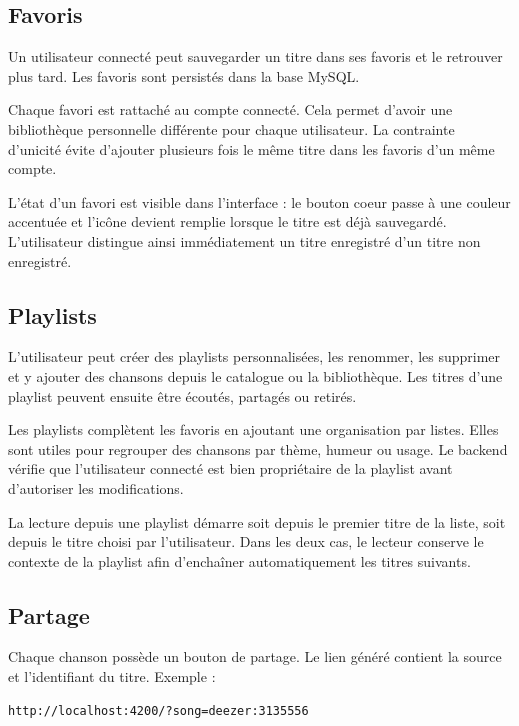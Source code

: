 \documentclass[12pt,a4paper]{report}
\begin{document}
\subsection{Favoris}

Un utilisateur connecté peut sauvegarder un titre dans ses favoris et le
retrouver plus tard. Les favoris sont persistés dans la base MySQL.

Chaque favori est rattaché au compte connecté. Cela permet d'avoir une
bibliothèque personnelle différente pour chaque utilisateur. La contrainte
d'unicité évite d'ajouter plusieurs fois le même titre dans les favoris d'un
même compte.

L'état d'un favori est visible dans l'interface : le bouton coeur passe à une
couleur accentuée et l'icône devient remplie lorsque le titre est déjà
sauvegardé. L'utilisateur distingue ainsi immédiatement un titre enregistré
d'un titre non enregistré.

\subsection{Playlists}

L'utilisateur peut créer des playlists personnalisées, les renommer, les
supprimer et y ajouter des chansons depuis le catalogue ou la bibliothèque. Les
titres d'une playlist peuvent ensuite être écoutés, partagés ou retirés.

Les playlists complètent les favoris en ajoutant une organisation par listes.
Elles sont utiles pour regrouper des chansons par thème, humeur ou usage. Le
backend vérifie que l'utilisateur connecté est bien propriétaire de la playlist
avant d'autoriser les modifications.

La lecture depuis une playlist démarre soit depuis le premier titre de la liste,
soit depuis le titre choisi par l'utilisateur. Dans les deux cas, le lecteur
conserve le contexte de la playlist afin d'enchaîner automatiquement les titres
suivants.

\subsection{Partage}

Chaque chanson possède un bouton de partage. Le lien généré contient la source
et l'identifiant du titre. Exemple :

\begin{lstlisting}
http://localhost:4200/?song=deezer:3135556
\end{lstlisting}
\end{document}
